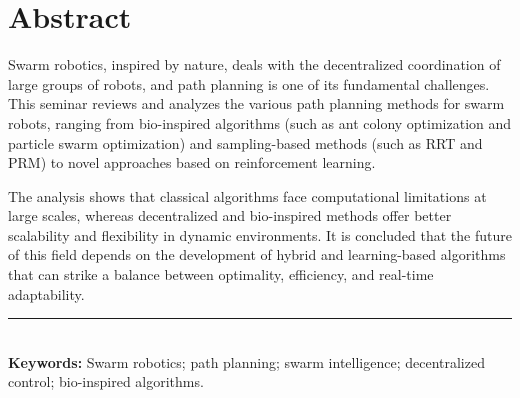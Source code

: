 \chapter*{Abstract}

Swarm robotics, inspired by nature, deals with the decentralized coordination of
large groups of robots, and path planning is one of its fundamental challenges.
This seminar reviews and analyzes the various path planning methods for swarm
robots, ranging from bio-inspired algorithms (such as ant colony optimization and
particle swarm optimization) and sampling-based methods (such as RRT and PRM) to
novel approaches based on reinforcement learning.

The analysis shows that classical algorithms face computational limitations at
large scales, whereas decentralized and bio-inspired methods offer better
scalability and flexibility in dynamic environments. It is concluded that the
future of this field depends on the development of hybrid and learning-based
algorithms that can strike a balance between optimality, efficiency, and
real-time adaptability.

\vspace{1.2em}
\noindent
{\color{primary!35}\rule{\linewidth}{0.5pt}}\\[2pt]
\noindent\textbf{\sffamily\color{primary}Keywords:}\enspace
Swarm robotics; path planning; swarm intelligence; decentralized control;
bio-inspired algorithms.
